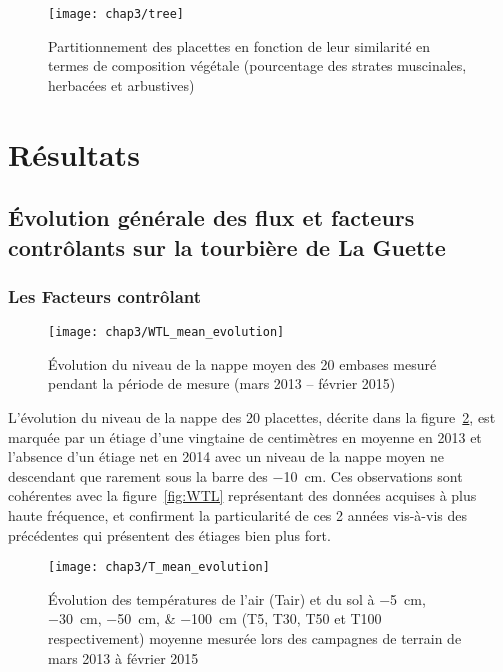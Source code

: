\begin{figure}[t]
\centering
\texttt{[image: chap3/tree]}
\caption{Partitionnement des placettes en fonction de leur similarité en termes de composition végétale (pourcentage des strates muscinales, herbacées et arbustives)}
\label{fig:tree}
\end{figure}



\section{Résultats}

\subsection{Évolution générale des flux et facteurs contrôlants sur la tourbière de La Guette}

\subsubsection{Les Facteurs contrôlant}

\begin{figure}
\centering
\texttt{[image: chap3/WTL\_mean\_evolution]}
\caption{Évolution du niveau de la nappe moyen des 20 embases mesuré pendant la période de mesure (mars 2013 -- février 2015)}
\label{fig:WTL_mean_evolution}
\end{figure}

L'évolution du niveau de la nappe des 20 placettes, décrite dans la figure~\ref{fig:WTL_mean_evolution}, est marquée par un étiage d'une vingtaine de centimètres en moyenne en 2013 et l'absence d'un étiage net en 2014 avec un niveau de la nappe moyen ne descendant que rarement sous la barre des \SI{-10}{\cm}.
Ces observations sont cohérentes avec la figure~\ref{fig:WTL} représentant des données acquises à plus haute fréquence, et confirment la particularité de ces 2 années vis-à-vis des précédentes qui présentent des étiages bien plus fort.

\begin{figure}
\centering
\texttt{[image: chap3/T\_mean\_evolution]}
\caption{Évolution des températures de l'air (Tair) et du sol à \SIlist{-5;-30;-50;-100}{\centi\metre} (T5, T30, T50 et T100 respectivement) moyenne mesurée lors des campagnes de terrain de mars 2013 à février 2015}
\label{fig:T_mean_evolution}
\end{figure}

